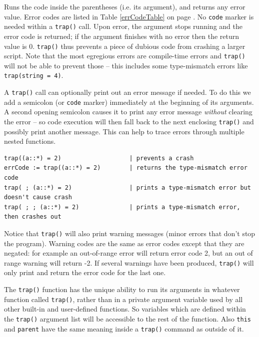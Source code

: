 \documentclass{article}
\newenvironment{code}{
       \begin{list}{}{
               \setlength{\leftmargin}{.4in}
               \setlength{\rightmargin}{0in}
               \setlength{\topsep}{.2in}
       }
       \small
       \item[] }
       { \end{list}   }
\begin{document}
Runs the code inside the parentheses (i.e. its argument), and returns any error value.  Error codes are listed in Table \ref{errCodeTable} on page \pageref{errCodeTable}.  No \texttt{code} marker is needed within a \texttt{trap()} call.  Upon error, the argument stops running and the error code is returned; if the argument finishes with no error then the return value is 0.  \verb#trap()# thus prevents a piece of dubious code from crashing a larger script.  Note that the most egregious errors are compile-time errors and \verb#trap()# will not be able to prevent those -- this includes some type-mismatch errors like \verb#trap(string = 4)#.

A \verb#trap()# call can optionally print out an error message if needed.  To do this we add a semicolon (or \verb#code# marker) immediately at the beginning of its arguments.  A second opening semicolon causes it to print any error message \emph{without} clearing the error -- so code execution will then fall back to the next enclosing \verb#trap()# and possibly print another message.  This can help to trace errors through multiple nested functions.

\begin{code} \begin{verbatim}
trap((a::*) = 2)                   | prevents a crash
errCode := trap((a::*) = 2)        | returns the type-mismatch error code
trap( ; (a::*) = 2)                | prints a type-mismatch error but doesn't cause crash
trap( ; ; (a::*) = 2)              | prints a type-mismatch error, then crashes out
\end{verbatim} \end{code}

\noindent Notice that \verb#trap()# will also print warning messages (minor errors that don't stop the program).  Warning codes are the same as error codes except that they are negated:  for example an out-of-range error will return error code 2, but an out of range warning will return -2.  If several warnings have been produced, \verb#trap()# will only print and return the error code for the last one.

The \verb#trap()# function has the unique ability to run its arguments in whatever function called \verb#trap()#, rather than in a private argument variable used by all other built-in and user-defined functions.  So variables which are defined within the \verb#trap()# argument list will be accessible to the rest of the function.  Also \verb#this# and \verb#parent# have the same meaning inside a \verb#trap()# command as outside of it.
\end{document}
